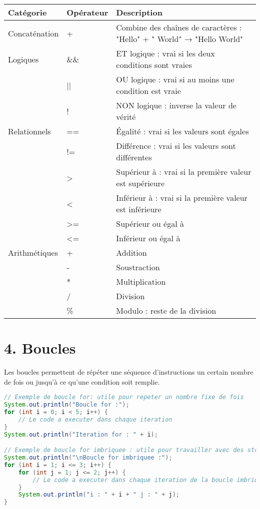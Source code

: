 \documentclass{article}
\begin{document}
\begin{tabular}{|l|l|p{8cm}|}
\hline
\textbf{Catégorie} & \textbf{Opérateur} & \textbf{Description} \\ 
\hline
Concaténation & + & Combine des chaînes de caractères : "Hello" + " World" → "Hello World" \\ 
\hline
Logiques & \&\& & ET logique : vrai si les deux conditions sont vraies \\ 
& || & OU logique : vrai si au moins une condition est vraie \\ 
& ! & NON logique : inverse la valeur de vérité \\ 
\hline
Relationnels & == & Égalité : vrai si les valeurs sont égales \\ 
& != & Différence : vrai si les valeurs sont différentes \\ 
& > & Supérieur à : vrai si la première valeur est supérieure \\ 
& < & Inférieur à : vrai si la première valeur est inférieure \\ 
& >= & Supérieur ou égal à \\ 
& <= & Inférieur ou égal à \\ 
\hline
Arithmétiques & + & Addition \\ 
& - & Soustraction \\ 
& * & Multiplication \\ 
& / & Division \\ 
& \% & Modulo : reste de la division \\ 
\hline
\end{tabular}

\section*{4. Boucles}
Les boucles permettent de répéter une séquence d'instructions un certain nombre de fois ou jusqu'à ce qu'une condition soit remplie.

\begin{lstlisting}[language=Java]
// Exemple de boucle for: utile pour repeter un nombre fixe de fois
System.out.println("Boucle for :");
for (int i = 0; i < 5; i++) {
    // Le code a executer dans chaque iteration
}
System.out.println("Iteration for : " + i);

// Exemple de boucle for imbriquee : utile pour travailler avec des structures multidimensionnelles
System.out.println("\nBoucle for imbriquee :");
for (int i = 1; i <= 3; i++) {
    for (int j = 1; j <= 2; j++) {
        // Le code a executer dans chaque iteration de la boucle imbriquee
    }
    System.out.println("i : " + i + " j : " + j);
}
\end{lstlisting}
\end{document}
